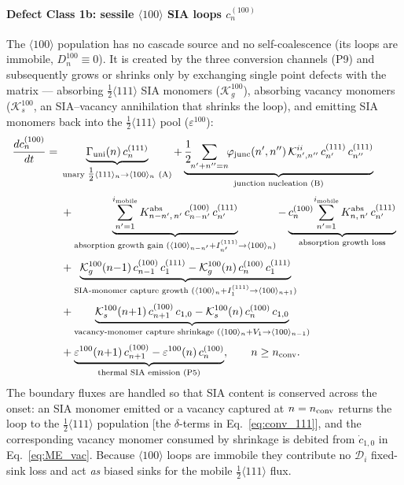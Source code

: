 \paragraph{Defect Class 1b: sessile $\langle100\rangle$ SIA loops $c^{(100)}_n$}
\label{sec:ME_SIA100}
The $\langle100\rangle$ population has no cascade source and no self-coalescence
(its loops are immobile, $D^{100}_n\equiv0$). It is created by the three
conversion channels (P9) and subsequently grows or shrinks only by exchanging
single point defects with the matrix --- absorbing $\tfrac12\langle111\rangle$
SIA monomers ($\mathcal{K}^{100}_g$), absorbing vacancy monomers
($\mathcal{K}^{100}_s$, an SIA--vacancy annihilation that shrinks the loop), and
emitting SIA monomers back into the $\tfrac12\langle111\rangle$ pool
($\varepsilon^{100}$):
\begin{equation}\label{eq:ME_SIA100}
\begin{split}
\frac{dc^{(100)}_n}{dt} = {} &
  \underbrace{\Gamma_{\rm uni}(n)\,c^{(111)}_n}_{\text{unary }\tfrac12\langle111\rangle_n\to\langle100\rangle_n\ (\text{A})}
  + \underbrace{
     \frac{1}{2}\!\!\sum_{n'+n''=n}\!\!
     \varphi_{\rm junc}(n',n'')\,\mathcal{K}_{n',n''}^{ii}\,
     c^{(111)}_{n'}\,c^{(111)}_{n''}
     }_{\text{junction nucleation }(\text{B})}
  \\[2pt]
  &+ \underbrace{
     \sum_{n'=1}^{i_{\rm mobile}}
     K^{\rm abs}_{n-n',\,n'}\,c^{(100)}_{n-n'}\,c^{(111)}_{n'}
     }_{\text{absorption growth gain }(\langle100\rangle_{n-n'}+I^{(111)}_{n'}\to\langle100\rangle_n)}
  - \underbrace{
     c^{(100)}_n\!\sum_{n'=1}^{i_{\rm mobile}}
     K^{\rm abs}_{n,\,n'}\,c^{(111)}_{n'}
     }_{\text{absorption growth loss}}
  \\[2pt]
  &+ \underbrace{
     \mathcal{K}^{100}_{g}(n{-}1)\,c^{(100)}_{n-1}\,c^{(111)}_1
   - \mathcal{K}^{100}_{g}(n)\,c^{(100)}_n\,c^{(111)}_1
     }_{\text{SIA-monomer capture growth }(\langle100\rangle_n+I^{(111)}_1\to\langle100\rangle_{n+1})}
  \\[2pt]
  &+ \underbrace{
     \mathcal{K}^{100}_{s}(n{+}1)\,c^{(100)}_{n+1}\,c_{1,0}
   - \mathcal{K}^{100}_{s}(n)\,c^{(100)}_n\,c_{1,0}
     }_{\text{vacancy-monomer capture shrinkage }(\langle100\rangle_n+V_1\to\langle100\rangle_{n-1})}
  \\[2pt]
  &+ \underbrace{
     \varepsilon^{100}(n{+}1)\,c^{(100)}_{n+1}
   - \varepsilon^{100}(n)\,c^{(100)}_n
     }_{\text{thermal SIA emission (P5)}},
   \qquad n \geq n_{\rm conv}.
\end{split}
\end{equation}
The boundary fluxes are handled so that SIA content is conserved across the
onset: an SIA monomer emitted or a vacancy captured at $n=n_{\rm conv}$ returns
the loop to the $\tfrac12\langle111\rangle$ population
[the $\delta$-terms in Eq.~\eqref{eq:conv_111}], and the corresponding vacancy
monomer consumed by shrinkage is debited from $\dot c_{1,0}$ in
Eq.~\eqref{eq:ME_vac}. Because $\langle100\rangle$ loops are immobile they
contribute no $\mathcal{D}_i$ fixed-sink loss and act \emph{as} biased sinks for
the mobile $\tfrac12\langle111\rangle$ flux.

